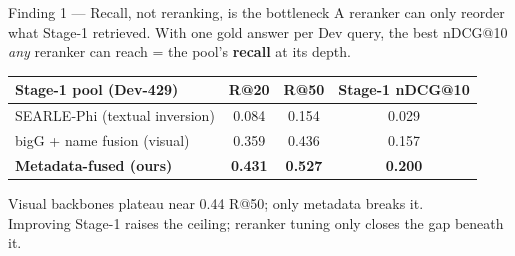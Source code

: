 \documentclass[aspectratio=169,10pt]{beamer}
\begin{document}
\begin{frame}{Finding 1 --- Recall, not reranking, is the bottleneck}
A reranker can only reorder what Stage-1 retrieved. With one gold answer per
Dev query, the best nDCG@10 \emph{any} reranker can reach = the pool's
\textbf{recall} at its depth.
\medskip
\begin{center}\small
\begin{tabular}{@{}lccc@{}}
\toprule
Stage-1 pool (Dev-429) & R@20 & R@50 & Stage-1 nDCG@10 \\
\midrule
SEARLE-Phi (textual inversion) & 0.084 & 0.154 & 0.029 \\
bigG + name fusion (visual)    & 0.359 & 0.436 & 0.157 \\
\textbf{Metadata-fused (ours)} & \textbf{0.431} & \textbf{0.527} & \textbf{0.200} \\
\bottomrule
\end{tabular}
\end{center}
\medskip
\begin{center}\color{accent}
Visual backbones plateau near 0.44 R@50; only metadata breaks it.\\
Improving Stage-1 raises the ceiling; reranker tuning only closes the gap beneath it.
\end{center}
\end{frame}
\end{document}
